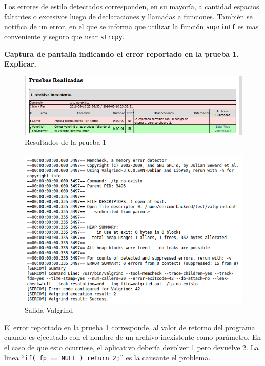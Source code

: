 \documentclass{article}
\begin{document}
    Los errores de estilo detectados corresponden, en su mayoría, a cantidad espacios faltantes o excesivos luego de declaraciones y llamadas a funciones. También se notifica de un error, en el que se informa que utilizar la función \texttt{snprintf} es mas conveniente y seguro que usar \texttt{strcpy}.\newline

\textbf{Captura de pantalla indicando el error reportado en la prueba 1. Explicar.}    
    
    \begin{figure}[H]
        \includegraphics[width=\columnwidth]{p3_test1}
        \caption{Resultados de la prueba 1}
    \end{figure}
        
    \begin{figure}[H]
        \includegraphics[width=\columnwidth]{p3_valgrind}
        \caption{Salida Valgrind}
    \end{figure}

    El error reportado en la prueba 1 corresponde, al valor de retorno del programa cuando es ejecutado con el nombre de un archivo inexistente como parámetro. En el caso de que esto ocurriese, el aplicativo debería devolver 1 pero devuelve 2. La linea ``\texttt{if( fp == NULL ) return 2;}'' es la causante el problema.
\end{document}
